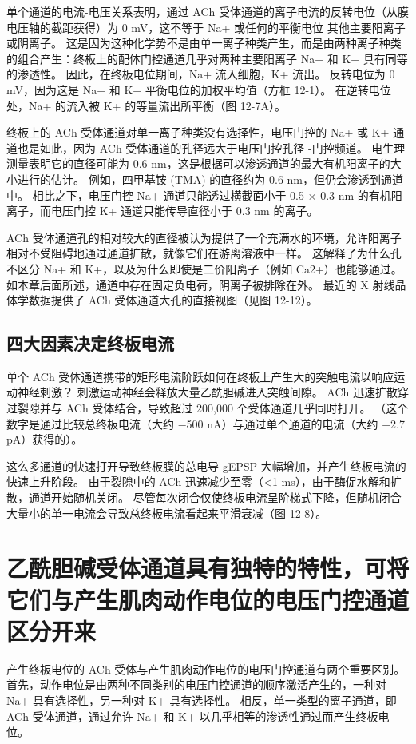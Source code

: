 单个通道的电流-电压关系表明，通过 ACh 受体通道的离子电流的反转电位（从膜电压轴的截距获得）为 0 mV，这不等于 Na+ 或任何的平衡电位 其他主要阳离子或阴离子。 
这是因为这种化学势不是由单一离子种类产生，而是由两种离子种类的组合产生：终板上的配体门控通道几乎对两种主要阳离子 Na+ 和 K+ 具有同等的渗透性。 
因此，在终板电位期间，Na+ 流入细胞，K+ 流出。 
反转电位为 0 mV，因为这是 Na+ 和 K+ 平衡电位的加权平均值（方框 12-1）。 
在逆转电位处，Na+ 的流入被 K+ 的等量流出所平衡（图 12-7A）。


终板上的 ACh 受体通道对单一离子种类没有选择性，电压门控的 Na+ 或 K+ 通道也是如此，因为 ACh 受体通道的孔径远大于电压门控孔径 -门控频道。 
电生理测量表明它的直径可能为 0.6 nm，这是根据可以渗透通道的最大有机阳离子的大小进行的估计。 
例如，四甲基铵 (TMA) 的直径约为 0.6 nm，但仍会渗透到通道中。 
相比之下，电压门控 Na+ 通道只能透过横截面小于 0.5 × 0.3 nm 的有机阳离子，而电压门控 K+ 通道只能传导直径小于 0.3 nm 的离子。


ACh 受体通道孔的相对较大的直径被认为提供了一个充满水的环境，允许阳离子相对不受阻碍地通过通道扩散，就像它们在游离溶液中一样。
这解释了为什么孔不区分 Na+ 和 K+，以及为什么即使是二价阳离子（例如 Ca2+）也能够通过。 
如本章后面所述，通道中存在固定负电荷，阴离子被排除在外。 
最近的 X 射线晶体学数据提供了 ACh 受体通道大孔的直接视图（见图 12-12）。


\subsection{四大因素决定终板电流}

单个 ACh 受体通道携带的矩形电流阶跃如何在终板上产生大的突触电流以响应运动神经刺激？ 
刺激运动神经会释放大量乙酰胆碱进入突触间隙。 
ACh 迅速扩散穿过裂隙并与 ACh 受体结合，导致超过 200,000 个受体通道几乎同时打开。 
（这个数字是通过比较总终板电流（大约 −500 nA）与通过单个通道的电流（大约 −2.7 pA）获得的）。


这么多通道的快速打开导致终板膜的总电导 gEPSP 大幅增加，并产生终板电流的快速上升阶段。 
由于裂隙中的 ACh 迅速减少至零（<1 ms），由于酶促水解和扩散，通道开始随机关闭。 
尽管每次闭合仅使终板电流呈阶梯式下降，但随机闭合大量小的单一电流会导致总终板电流看起来平滑衰减（图 12-8）。




\section{乙酰胆碱受体通道具有独特的特性，可将它们与产生肌肉动作电位的电压门控通道区分开来}

产生终板电位的 ACh 受体与产生肌肉动作电位的电压门控通道有两个重要区别。 
首先，动作电位是由两种不同类别的电压门控通道的顺序激活产生的，一种对 Na+ 具有选择性，另一种对 K+ 具有选择性。 
相反，单一类型的离子通道，即 ACh 受体通道，通过允许 Na+ 和 K+ 以几乎相等的渗透性通过而产生终板电位。


